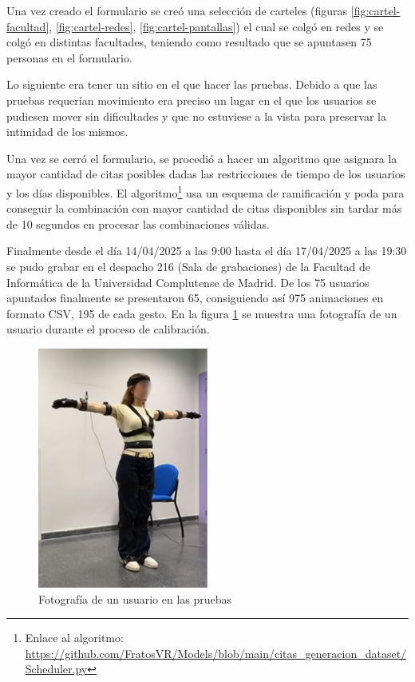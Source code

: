 Una vez creado el formulario se creó una selección de carteles (figuras \ref{fig:cartel-facultad}, \ref{fig:cartel-redes}, \ref{fig:cartel-pantallas}) el cual se colgó en redes y se colgó en distintas facultades, teniendo como resultado que se apuntasen 75 personas en el formulario.

Lo siguiente era tener un sitio en el que hacer las pruebas. Debido a que las pruebas requerían movimiento era preciso un lugar en el que los usuarios se pudiesen mover sin dificultades y que no estuviese a la vista para preservar la intimidad de los mismos.

Una vez se cerró el formulario, se procedió a hacer un algoritmo que asignara la mayor cantidad de citas posibles dadas las restricciones de tiempo de los usuarios y los días disponibles. El algoritmo\footnote{Enlace al algoritmo: \url{https://github.com/FratosVR/Models/blob/main/citas_generacion_dataset/Scheduler.py}} usa un esquema de ramificación y poda para conseguir la combinación con mayor cantidad de citas disponibles sin tardar más de 10 segundos en procesar las combinaciones válidas.

Finalmente desde el día 14/04/2025 a las 9:00 hasta el día 17/04/2025 a las 19:30 se pudo grabar en el despacho 216 (Sala de grabaciones) de la Facultad de Informática de la Universidad Complutense de Madrid.
De los 75 usuarios apuntados finalmente se presentaron 65, consiguiendo así 975 animaciones en formato CSV, 195 de cada gesto. En la figura \ref{fig:PruebasLidia} se muestra una fotografía de un usuario durante el proceso de calibración.

\begin{figure}[H]
	\centering
	\includegraphics[width=0.5\textwidth]{Imagenes/Vectorial/LidiaPruebasBlurr.pdf}
	\caption{Fotografía de un usuario en las pruebas}
	\label{fig:PruebasLidia}
\end{figure}

